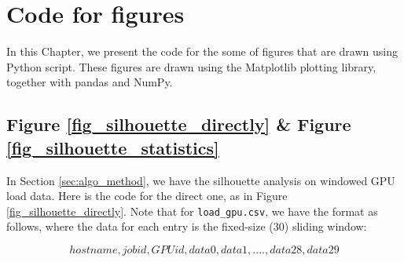 \chapter{Code for figures}
In this Chapter, we present the code for the some of figures that are drawn using Python script. These figures are drawn using the Matplotlib plotting library, together with pandas and NumPy.

\section{Figure \ref{fig_silhouette_directly} \& Figure \ref{fig_silhouette_statistics}}
In Section \ref{sec:algo_method}, we have the silhouette analysis on windowed GPU load data. Here is the code for the direct one, as in Figure \ref{fig_silhouette_directly}. Note that for \texttt{load\_gpu.csv}, we have the format as follows, where the data for each entry is the fixed-size (30) sliding window:

\begin{equation*}
hostname,job id,GPU id,data 0,data 1,....,data 28,data 29
\end{equation*}

